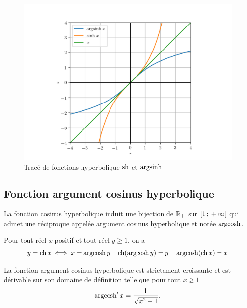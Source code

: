 \begin{figure}
  \centering
  \includegraphics[scale = 0.8]{argsinh.png}
  \caption{Tracé de fonctions hyperbolique \(\operatorname{sh}\) et
  \(\operatorname{argsinh}\)}\label{fig:tracesinhargsh}
\end{figure}

\subsection{Fonction argument cosinus
hyperbolique}\label{subsec:chap1-fonctionargcosh}

\begin{defdef}
  La fonction cosinus hyperbolique induit une bijection de \(\mathbb{R}_{+}\) sur
  \(\left[ 1 \, ; {} +\infty \right[\) qui admet une réciproque appelée argument
  cosinus hyperbolique et notée \(\operatorname{argcosh}\).
\end{defdef}

\begin{prop}
  Pour tout réel \(x\) positif et tout réel \(y \geq 1\), on a
  \begin{equation}
    y = \operatorname{ch}{x} \iff x = \operatorname{argcosh} y \quad \operatorname{ch}(\operatorname{argcosh} y) = y \quad \operatorname{argcosh}(\operatorname{ch}
    x) = x
  \end{equation}
\end{prop}

\begin{prop}
  La fonction argument cosinus hyperbolique est strictement croissante et est
  dérivable sur son domaine de définition telle que pour tout \(x \geqslant 1\)
  \begin{equation}
    \operatorname{argcosh}'{x} = \frac{1}{\sqrt{{x}^2-1}}.
  \end{equation}
\end{prop}

